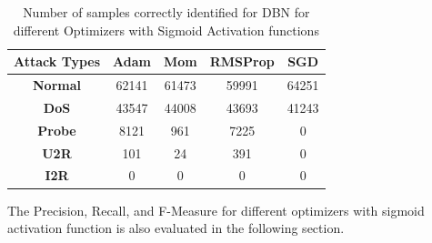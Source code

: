 \documentclass[12pt, a4paper]{report}
\begin{document}
\begin{table}[ht]
\centering
\captionsetup{justification=centering,margin=2cm}
\begin{tabular}{|c|c|c|c|c|}
\hline
\textbf{Attack Types} & \textbf{Adam} & \textbf{Mom} & \textbf{RMSProp} & \textbf{SGD} \\ \hline
\textbf{Normal}       & 62141         & 61473        & 59991            & 64251        \\ \hline
\textbf{DoS}          & 43547         & 44008        & 43693            & 41243        \\ \hline
\textbf{Probe}        & 8121          & 961          & 7225             & 0            \\ \hline
\textbf{U2R}          & 101           & 24           & 391              & 0            \\ \hline
\textbf{I2R}          & 0             & 0            & 0                & 0            \\ \hline
\end{tabular}
\caption{Number of samples correctly identified for DBN for different Optimizers with Sigmoid Activation functions}
\label{DBN_predicted_attacks}
\end{table}

The Precision, Recall, and F-Measure for different optimizers with sigmoid activation function is also evaluated in the following section.
\end{document}
